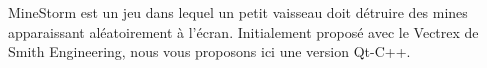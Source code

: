 Mine\-Storm est un jeu dans lequel un petit vaisseau doit détruire des mines apparaissant aléatoirement à l'écran. Initialement proposé avec le Vectrex de Smith Engineering, nous vous proposons ici une version Qt-\/\-C++. 